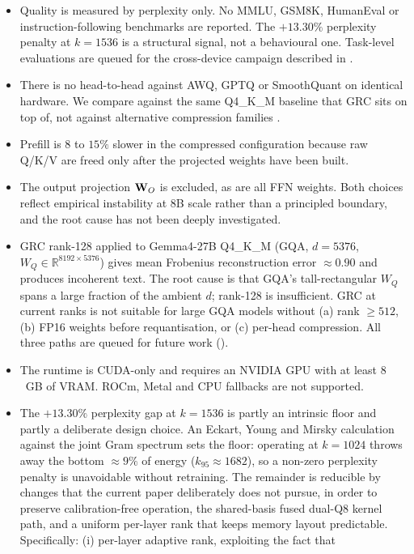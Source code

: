 \documentclass[11pt]{article}
\begin{document}
\begin{itemize}
\item Quality is measured by perplexity only. No MMLU, GSM8K, HumanEval
or instruction-following benchmarks are reported. The $+13.30\%$
perplexity penalty at $k{=}1536$ is a structural signal, not a
behavioural one. Task-level evaluations are queued for the cross-device
campaign described in .
\item There is no head-to-head against AWQ, GPTQ or SmoothQuant on
identical hardware. We compare against the same Q4\_K\_M baseline that
GRC sits on top of, not against alternative compression families
\cite{lin2023awq,frantar2022gptq,xiao2022smoothquant}.
\item Prefill is $8$ to $15\%$ slower in the compressed configuration
because raw Q/K/V are freed only after the projected weights have been
built.
\item The output projection $\mathbf{W}_O$ is excluded, as are all FFN
weights. Both choices reflect empirical instability at 8B scale rather
than a principled boundary, and the root cause has not been deeply
investigated.
\item GRC rank-128 applied to Gemma4-27B Q4\_K\_M (GQA, $d{=}5376$,
$W_Q\!\in\!\mathbb{R}^{8192\times5376}$) gives mean Frobenius
reconstruction error ${\approx}0.90$ and produces incoherent text. The
root cause is that GQA's tall-rectangular $W_Q$ spans a large fraction
of the ambient $d$; rank-128 is insufficient. GRC at current ranks is
not suitable for large GQA models without (a) rank ${\geq}512$,
(b) FP16 weights before requantisation, or (c) per-head compression.
All three paths are queued for future work ().
\item The runtime is CUDA-only and requires an NVIDIA GPU with at least
$8$~GB of VRAM. ROCm, Metal and CPU fallbacks are not supported.
\item The $+13.30\%$ perplexity gap at $k{=}1536$ is partly an
intrinsic floor and partly a deliberate design choice. An Eckart, Young
and Mirsky calculation against the joint Gram spectrum sets the floor:
operating at $k{=}1024$ throws away the bottom ${\approx}9\%$ of energy
($k_{95}{\approx}1682$), so a non-zero perplexity penalty is unavoidable
without retraining. The remainder is reducible by changes that the
current paper deliberately does not pursue, in order to preserve
calibration-free operation, the shared-basis fused dual-Q8 kernel path,
and a uniform per-layer rank that keeps memory layout predictable.
Specifically: (i) per-layer adaptive rank, exploiting the fact that

\end{itemize}
\end{document}
